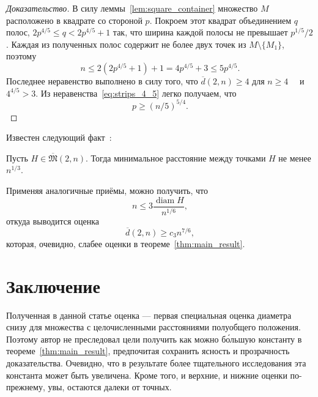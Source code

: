 \documentclass[11pt,twoside,draft
]{article}
\begin{document}
\begin{proof}[Доказательство]
	В силу леммы~\ref{lem:square_container} множество $M$ расположено в квадрате со стороной $p$.
	Покроем этот квадрат объединением $q$ полос, $2p^{4/5} \leq q < 2p^{4/5} + 1$ так,
	что ширина каждой полосы не превышает $p^{1/5} / 2$.
	Каждая из полученных полос содержит не более двух точек из  $M\setminus\{M_1\}$,
	поэтому
	\begin{equation}
		\label{eq:strips_4_5}
		n \leq 2(2p^{4/5} + 1) + 1
		= 4p^{4/5}+3
		\leq 5 p^{4/5}
		.
	\end{equation}
	Последнее неравенство выполнено в силу того, что $\overline{d}(2,n) \geq 4$ для $n\geq 4$~~\cite{kurz2008minimum}
	и $4^{4/5}>3$.
	Из неравенства~\eqref{eq:strips_4_5} легко получаем, что
	\begin{equation}
		\label{eq:strips_5_4}
		p \geq (n/5) ^ {5/4}
		.
	\end{equation}
\end{proof}



\begin{remark}
	Известен следующий факт~\cite[следствие 1]{solymosi2003note}:
\end{remark}

\begin{lemm}
	Пусть $H \in \overline {\mathfrak{M}}(2,n)$.
	Тогда минимальное расстояние между точками $H$ не менее $n^{1/3}$.
\end{lemm}
Применяя аналогичные приёмы, можно получить, что
\begin{equation}
	n \leq 3 \frac{\operatorname{diam} H }{n^{1/6}}
	,
\end{equation}
откуда выводится оценка
\begin{equation}
	\overline{d}(2,n) \geq c_3 n^{7/6}
	,
\end{equation}
которая, очевидно, слабее оценки в теореме~\ref{thm:main_result}.


\section{Заключение}
Полученная в данной статье оценка ---
первая специальная оценка диаметра снизу для множества с целочисленными расстояниями полуобщего положения.
Поэтому автор не преследовал цели получить как можно б\'{о}льшую константу в теореме~\ref{thm:main_result},
предпочитая сохранить ясность и прозрачность доказательства.
Очевидно, что в результате более тщательного исследования эта константа может быть увеличена.
Кроме того, и верхние, и нижние оценки по-прежнему, увы, остаются далеки от точных.
\end{document}
